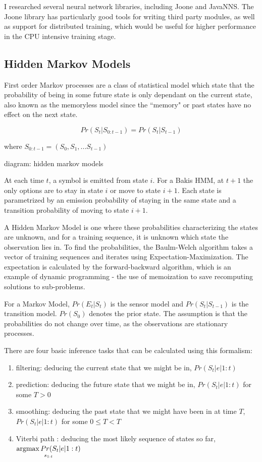 \documentclass[12pt,a4,notitlepage]{report}
\renewcommand{\_}{\texttt{\symbol{95}}}
\newcommand{\<}{\texttt{\symbol{60}}}
\renewcommand{\>}{\texttt{\symbol{62}}}
\begin{document}
I researched several neural network libraries, including Joone and JavaNNS. The Joone library has particularly good tools for writing third party modules, as well as support for distributed training, which would be useful for higher performance in the CPU intensive training stage.

\subsection{Hidden Markov Models}

First order Markov processes are a class of statistical model which state that the probability of being in some future state is only dependant on the current state, also known as the memoryless model since the ``memory" or past states have no effect on the next state.

\[ Pr(S_t|S_{0:t-1}) = Pr(S_t|S_{t-1}) \]

where $S_{0:t-1} = (S_0,S_1,...S_{t-1})$


{diagram: hidden markov models}

At each time $t$, a symbol is emitted from state $i$. For a Bakis HMM, at $t+1$ the only options are to stay in state $i$ or move to state $i+1$. Each state is parametrized by an emission probability of staying in the same state and a transition probability of moving to state $i+1$.

A Hidden Markov Model is one where these probabilities characterizing the states are unknown, and for a training sequence, it is unknown which state the observation lies in. To find the probabilities, the Baulm-Welch algorithm takes a vector of training sequences and iterates using Expectation-Maximization. The expectation is calculated by the forward-backward algorithm, which is an example of dynamic programming - the use of memoization to save recomputing solutions to sub-problems.

For a Markov Model, $Pr(E_t|S_t)$ is the sensor model and $Pr(S_t|S_{t-1})$ is the transition model. $Pr(S_0)$ denotes the prior state.\cite{AIModern} The assumption is that the probabilities do not change over time, as the observations are stationary processes.

There are four basic inference tasks that can be calculated using this formalism:

\begin{enumerate}
\item filtering: deducing the current state that we might be in, $Pr(S_t|e|{1:t})$
\item prediction: deducing the future state that we might be in, $Pr(S_t|e|{1:t})$ for some $T>0$
\item smoothing: deducing the past state that we might have been in at time $T$, $Pr(S_t|e|{1:t})$ for some $0 \le T < T$
\item Viterbi path : deducing the most likely sequence of states so far, $\underset{s_{1:t}}{\operatornamewithlimits{argmax}Pr(S_t|e|{1:t})}$
\end{enumerate}
\end{document}
